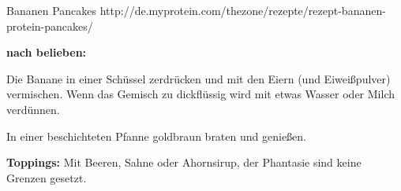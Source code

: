 \begin{recipe}[]{ Bananen Pancakes }{ http://de.myprotein.com/thezone/rezepte/rezept-bananen-protein-pancakes/ }{  }


\textbf{nach belieben:}
\ingredient{}

\step
Die Banane in einer Schüssel zerdrücken und mit den Eiern (und Eiweißpulver) vermischen. Wenn das Gemisch zu dickflüssig wird mit etwas Wasser oder Milch verdünnen.

\step
In einer beschichteten Pfanne goldbraun braten und genießen.

\step 
\textbf{Toppings:} Mit Beeren, Sahne oder Ahornsirup, der Phantasie sind keine Grenzen gesetzt.


\end{recipe}